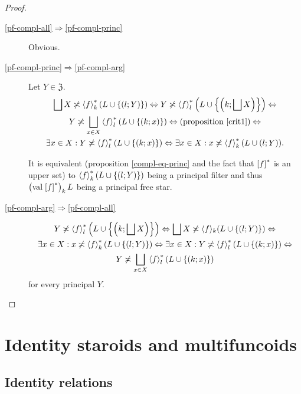 \begin{proof}
~
\begin{description}
\item [{\ref{pf-compl-all}$\Rightarrow$\ref{pf-compl-princ}}] Obvious.
\item [{\ref{pf-compl-princ}$\Rightarrow$\ref{pf-compl-arg}}] Let $Y\in\mathfrak{Z}$.
\begin{multline*}
\bigsqcup X\not\asymp\left\langle f\right\rangle ^{\ast}_{k}(L\cup\{(l;Y)\})\Leftrightarrow Y\not\asymp\left\langle f\right\rangle ^{\ast}_{l}\left(L\cup\left\{ \left(k;\bigsqcup X\right)\right\} \right)\Leftrightarrow\\
Y\not\asymp\bigsqcup_{x\in X}\left\langle f\right\rangle ^{\ast}_{l}(L\cup\{(k;x)\})\Leftrightarrow\text{(proposition \ref{crit1})}\Leftrightarrow\\
\exists x\in X:Y\not\asymp\left\langle f\right\rangle ^{\ast}_{l}(L\cup\{(k;x)\})\Leftrightarrow\exists x\in X:x\not\asymp\left\langle f\right\rangle ^{\ast}_{k}(L\cup(l;Y)).
\end{multline*}



It is equivalent (proposition \ref{compl-eq-princ} and the fact that
$\mathrel{\left[f\right]^{\ast}}$ is an upper set) to $\left\langle f\right\rangle ^{\ast}_{k}(L\cup\{(l;Y)\})$
being a principal filter and thus $\left(\operatorname{val}\mathrel{\left[f\right]^{\ast}}\right)_{k}L$
being a principal free star.

\item [{\ref{pf-compl-arg}$\Rightarrow$\ref{pf-compl-all}}] 
\begin{multline*}
Y\not\asymp\left\langle f\right\rangle ^{\ast}_{l}\left(L\cup\left\{ \left(k;\bigsqcup X\right)\right\} \right)\Leftrightarrow\bigsqcup X\not\asymp\langle f\rangle_{k}(L\cup\{(l;Y)\})\Leftrightarrow\\
\exists x\in X:x\not\asymp\left\langle f\right\rangle ^{\ast}_{k}(L\cup\{(l;Y)\})\Leftrightarrow\exists x\in X:Y\not\asymp\left\langle f\right\rangle ^{\ast}_{l}(L\cup\{(k;x)\})\Leftrightarrow\\
Y\not\asymp\bigsqcup_{x\in X}\left\langle f\right\rangle ^{\ast}_{l}(L\cup\{(k;x)\})
\end{multline*}
for every principal $Y$.
\end{description}
\end{proof}

\section{Identity staroids and multifuncoids}


\subsection{Identity relations}

